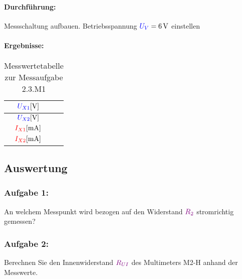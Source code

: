 \documentclass[11pt,a4paper,titlepage,parskip=half]{scrreprt}
\begin{document}
                    \paragraph{Durchführung:} Messschaltung aufbauen. Betriebsspannung $\textcolor{blue}{U_V} = \SI{6}{\volt}$ einstellen
                    \pagebreak
                    \paragraph{Ergebnisse:}
                        \begin{center}
                            \begin{table}[H]
                                \caption{Messwertetabelle zur Messaufgabe 2.3.M1}
                                \label{tbl:messergebnisse2.2}
                                \renewcommand{\arraystretch}{1.6}
                                \begin{center}
                                    \begin{tabular}{c|c}
                                        $\textcolor{blue}{U_{X1}} [\si{\volt}]$ & \qquad\qquad\qquad\\\hline
                                        $\textcolor{blue}{U_{X2}} [\si{\volt}]$ & \\ \hline
                                        $\textcolor{red}{I_{X1}} [\si{\milli\ampere}]$ & \\\hline
                                        $\textcolor{red}{I_{X2}} [\si{\milli\ampere}]$ & 
                                    \end{tabular}
                                \end{center}
                            \end{table}
                        \end{center}
                  
                
            \subsection{Auswertung}
                \subsubsection{Aufgabe 1:}  An welchem Messpunkt wird bezogen auf den Widerstand $\textcolor{violet}{R_2}$ stromrichtig gemessen?
                                
                
                \subsubsection{Aufgabe 2:} Berechnen Sie den Innenwiderstand $\textcolor{violet}{R_{UI}}$ des Multimeters M2-H anhand der Messwerte.
                
\end{document}
